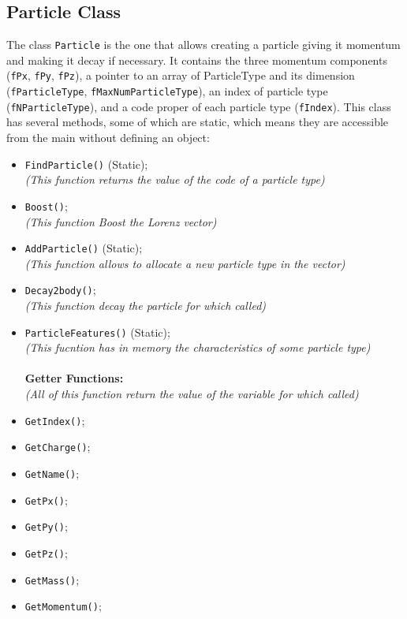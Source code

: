 \documentclass[a4paper, 11pt]{article}
\begin{document}
      \subsection* {Particle Class}
      The class \verb|Particle| is the one that allows creating a particle giving it momentum and making it decay if necessary. It contains the three momentum components (\verb|fPx|, \verb|fPy|, \verb|fPz|), a pointer to an array of ParticleType and its dimension (\verb|fParticleType|, \verb|fMaxNumParticleType|), an index of particle type (\verb|fNParticleType|), and a code proper of each particle type (\verb|fIndex|). This class has several methods, some of which are static, which means they are accessible from the main without defining an object:
      \begin{itemize}
        \item{\verb|FindParticle()| (Static); }
        \\\textit{(This function returns the value of the code of a particle type)}
        \item{\verb|Boost()|; }
        \\\textit{(This function Boost the Lorenz vector)}
        \item{\verb|AddParticle()| (Static); }
        \\\textit{(This function allows to allocate a new particle type in the vector)}
        \item{\verb|Decay2body()|; }
        \\\textit{(This function decay the particle for which called)}\newpage
        \item{\verb|ParticleFeatures()| (Static); }
        \\\textit{(This fucntion has in memory the characteristics of some particle type)}
        \\ \\ \textbf{Getter Functions:}
        \\\textit{(All of this function return the value of the variable for which called)}
        \item{\verb|GetIndex()|; }
        \item{\verb|GetCharge()|; }
        \item{\verb|GetName()|; }
        \item{\verb|GetPx()|; }
        \item{\verb|GetPy()|; }
        \item{\verb|GetPz()|; }
        \item{\verb|GetMass()|; }
        \item{\verb|GetMomentum()|; }

\end{itemize}
\end{document}
